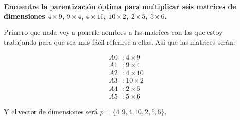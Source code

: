 \textbf{Encuentre la parentización óptima para multiplicar seis matrices de dimensiones $4 \times 9$, $9 \times 4$, $4 \times 10$, $10 \times 2$, $2 \times 5$, $5 \times 6$.}\vspace{.2cm}

Primero que nada voy a ponerle nombres a las matrices con las que estoy trabajando para que sea más fácil referirse a ellas. Así que las matrices serán:

\begin{align*}
    A0 & : 4 \times 9 \\
    A1 & : 9 \times 4 \\
    A2 & : 4 \times 10 \\
    A3 & : 10 \times 2 \\
    A4 & : 2 \times 5 \\
    A5 & : 5 \times 6   
\end{align*}

Y el vector de dimensiones será $p = \{4, 9, 4, 10, 2, 5, 6\}$. \vspace{.2cm}

